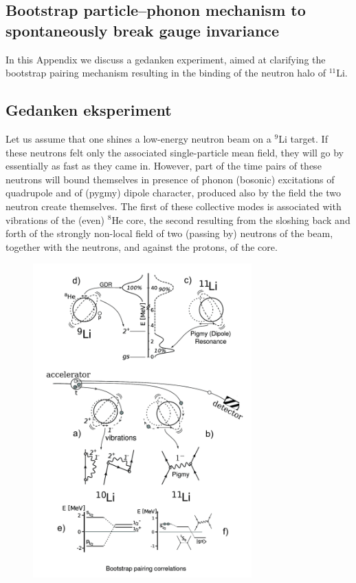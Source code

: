 \begin{subappendices}
\section[Bootstrap mechanism to break gauge invariance]{Bootstrap particle--phonon mechanism to spontaneously break gauge invariance}\label{C8AppA}
In this Appendix we discuss a gedanken experiment, aimed at clarifying the bootstrap pairing mechanism resulting in the binding of the neutron halo of $^{11}$Li. 
\subsection{Gedanken eksperiment}
Let us assume that one shines a  low-energy neutron beam on a $^{9}$Li target. If these neutrons felt only the associated single-particle mean field, they will go by essentially as fast as they came in.  However,  part of the time pairs of these neutrons will bound themselves in  presence of phonon (bosonic) excitations of quadrupole and of (pygmy) dipole character, produced also by the field the two neutron create themselves. The first of these collective modes is  associated with vibrations of the (even) $^{8}$He core, the second resulting from the sloshing back and forth of the strongly non-local field of two (passing by) neutrons of the beam, together with the neutrons, and against the protons, of the core.
\begin{figure}[h!]
	\begin{center}
		\includegraphics[width=0.75\textwidth]{C8/figsC8/BootStrap_Li}

\end{center}
\end{figure}
\end{subappendices}
